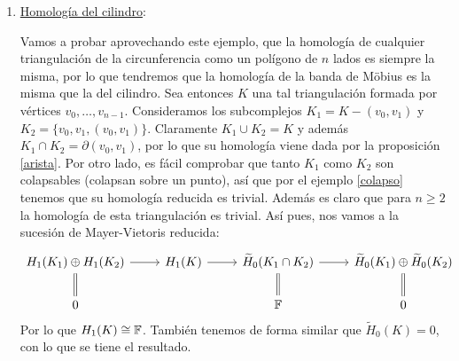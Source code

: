 \documentclass[HS.tex]{subfiles}
\begin{document}
\begin{ej}
\begin{enumerate}
\item \underline{Homología del cilindro}:
\begin{figure}[H]
\centering
{}
\end{figure}
Vamos a probar aprovechando este ejemplo, que la homología de cualquier triangulación de la circunferencia como un polígono de $n$ lados es siempre la misma, por lo que tendremos que la homología de la banda de Möbius es la misma que la del cilindro. Sea entonces $K$ una tal triangulación formada por vértices $v_0,\dots, v_{n-1}$. Consideramos los subcomplejos $K_1=K-(v_0,v_1)$ y $K_2=\{v_0,v_1,(v_0,v_1)\}$. Claramente $K_1\cup K_2=K$ y además $K_1\cap K_2=\partial(v_0,v_1)$, por lo que su homología viene dada por la proposición \ref{arista}. Por otro lado, es fácil comprobar que tanto $K_1$ como $K_2$ son colapsables (colapsan sobre un punto), así que por el ejemplo \ref{colapso} tenemos que su homología reducida es trivial. Además es claro que para $n\geq 2$ la homología de esta triangulación es trivial. Así pues, nos vamos a la sucesión de Mayer-Vietoris reducida:
\[
\begin{tikzcd}
 H_1(K_1)\oplus H_1(K_2)\arrow[d,equal]\arrow[r] & H_1(K)\arrow[r] & \widetilde{H}_0(K_1\cap K_2)\arrow[d,equal]\arrow[r] & \widetilde{H}_0(K_1)\oplus \widetilde{H}_0(K_2)\arrow[d,equal]\\
                    0                              &                 &  \F & 0
\end{tikzcd}
\]
Por lo que $H_1(K)\cong\mathbb{F}$. También tenemos de forma similar que $\widetilde{H}_0(K)=0$, con lo que se tiene el resultado. 
\end{enumerate}
\end{ej}
\end{document}
